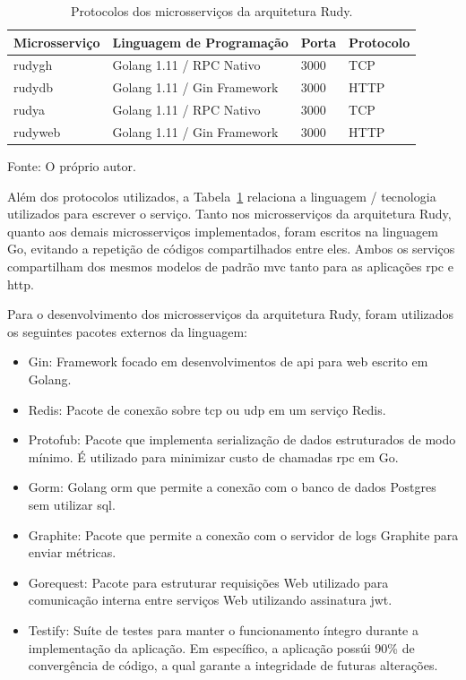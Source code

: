 \begin{table}[htb!]
    \centering
    \caption{Protocolos dos microsserviços da arquitetura Rudy.}
    \label{tab:protocolos_rudy}
    \begin{tabular}{|l|l|l|l|}
    \hline
    Microsserviço & Linguagem de Programação    & Porta & Protocolo \\ \hline
    rudygh        & Golang 1.11 / RPC Nativo    & 3000  & TCP       \\ \hline
    rudydb        & Golang 1.11 / Gin Framework & 3000  & HTTP      \\ \hline
    rudya         & Golang 1.11 / RPC Nativo    & 3000  & TCP       \\ \hline
    rudyweb       & Golang 1.11 / Gin Framework & 3000  & HTTP      \\ \hline
    \end{tabular}
    
    Fonte: O próprio autor.
\end{table}


Além dos protocolos utilizados, a Tabela~\ref{tab:protocolos_rudy} relaciona a linguagem / tecnologia utilizados para escrever o serviço.
%
Tanto nos microsserviços da arquitetura Rudy, quanto aos demais microsserviços implementados, foram escritos na linguagem Go, evitando a repetição de códigos compartilhados entre eles.
%
Ambos os serviços compartilham dos mesmos modelos de padrão \ac{mvc} tanto para as aplicações \ac{rpc} e \ac{http}.

Para o desenvolvimento dos microsserviços da arquitetura Rudy, foram utilizados os seguintes pacotes externos da linguagem:

\begin{itemize}
    \item Gin: Framework focado em desenvolvimentos de \ac{api} para web escrito em Golang.
    \item Redis: Pacote de conexão sobre \ac{tcp} ou \ac{udp} em um serviço Redis.
    \item Protofub: Pacote que implementa serialização de dados estruturados de modo mínimo. É utilizado para minimizar custo de chamadas \ac{rpc} em Go.
    \item Gorm: Golang \ac{orm} que permite a conexão com o banco de dados Postgres sem utilizar \ac{sql}.
    \item Graphite: Pacote que permite a conexão com o servidor de logs Graphite para enviar métricas.
    \item Gorequest: Pacote para estruturar requisições Web utilizado para comunicação interna entre serviços Web utilizando assinatura \ac{jwt}.
    \item Testify: Suíte de testes para manter o funcionamento íntegro durante a implementação da aplicação. Em específico, a aplicação possúi 90\% de convergência de código, a qual garante a integridade de futuras alterações.
\end{itemize}

